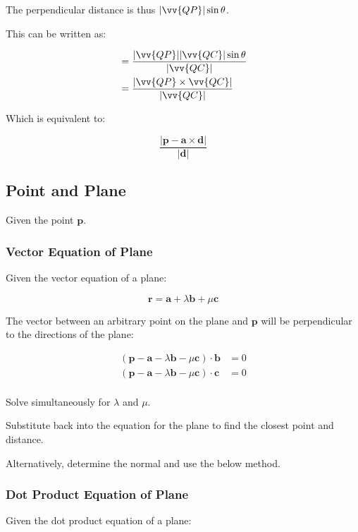 \documentclass[a4paper,11pt]{report}
\newcommand{\bb}{\boldsymbol}
\begin{document}
The perpendicular distance is thus $\lvert \vv{QP} \rvert \sin{\theta}$.

This can be written as:

$$
\begin{aligned}
& = \frac{\lvert \vv{QP} \rvert \lvert \vv{QC} \rvert \sin{\theta}}{\lvert \vv{QC} \rvert} \\
& = \frac{\lvert \vv{QP} \times \vv{QC} \rvert}{\lvert \vv{QC} \rvert} \\
\end{aligned}
$$

Which is equivalent to:

$$
\frac{\lvert \bb{p} - \bb{a} \times \bb{d} \rvert}{\lvert \bb{d} \rvert}
$$

\subsection{Point and Plane}

Given the point $\bb{p}$.

\subsubsection{Vector Equation of Plane}

Given the vector equation of a plane:

$$
\bb{r} = \bb{a} + \lambda \bb{b} + \mu \bb{c}
$$

The vector between an arbitrary point on the plane and $\bb{p}$ will be
perpendicular to the directions of the plane:

$$
\begin{aligned}
(\bb{p} - \bb{a} - \lambda \bb{b} - \mu \bb{c}) \cdot \bb{b} & = 0 \\
(\bb{p} - \bb{a} - \lambda \bb{b} - \mu \bb{c}) \cdot \bb{c} & = 0 \\
\end{aligned}
$$

Solve simultaneously for $\lambda$ and $\mu$.

Substitute back into the equation for the plane to find the closest point and
distance.

Alternatively, determine the normal and use the below method.

\subsubsection{Dot Product Equation of Plane}

Given the dot product equation of a plane:
\end{document}
